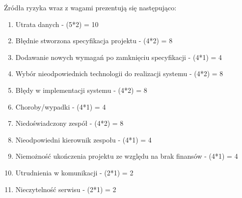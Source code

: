 \documentclass{article}
\begin{document}
Źródła ryzyka wraz z wagami prezentują się następująco:
\begin{enumerate}
\item{Utrata danych - (5*2) = 10}
\item{Błędnie stworzona specyfikacja projektu - (4*2) = 8}
\item{Dodawanie nowych wymagań po zamknięciu specyfikacji - (4*1) = 4}
\item{Wybór nieodpowiednich technologii do realizacji systemu - (4*2) = 8}
\item{Błędy w implementacji systemu - (4*2) = 8}
\item{Choroby/wypadki - (4*1) = 4}
\item{Niedoświadczony zespół - (4*2) = 8}
\item{Nieodpowiedni kierownik zespołu - (4*1) = 4}
\item{Niemożność ukończenia projektu ze względu na brak finansów - (4*1) = 4}
\item{Utrudnienia w komunikacji - (2*1) = 2}
\item{Nieczytelność serwisu - (2*1) = 2}
\end{enumerate}
\mbox{}\\ \mbox{}\\
\end{document}
